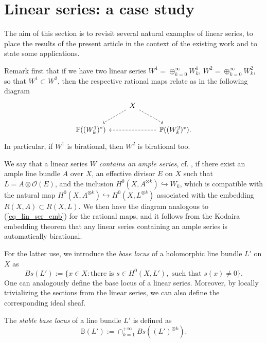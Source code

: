 \documentclass[12pt]{article}
\numberwithin{equation}{section}
\theoremstyle{theorem}
\theoremstyle{definition}
\theoremstyle{remark}
\begin{document}
	\section{Linear series: a case study}\label{sect_exampl}
	The aim of this section is to revisit several natural examples of linear series, to place the results of the present article in the context of the existing work and to state some applications.
	\par 
	Remark first that if we have two linear series $W^1 = \oplus_{k = 0}^{\infty} W^1_k$, $W^2 = \oplus_{k = 0}^{\infty} W^2_k$, so that $W^1 \subset W^2$, then the respective rational maps relate as in the following diagram
	\begin{equation}\label{eq_lin_ser_emb}
		\begin{tikzcd}
		& X \arrow[dl, dashed] \arrow[dr, dashed] & \\
\mathbb{P}((W_k^1)^*) & & \arrow[ll, dashed] \mathbb{P}((W_k^2)^*).
		\end{tikzcd}
	\end{equation}
	In particular, if $W^1$ is birational, then $W^2$ is birational too.
	\par 
	We say that a linear series $W$ \textit{contains an ample series}, cf. \cite{LazMus}, if there exist an ample line bundle $A$ over $X$, an effective divisor $E$ on $X$ such that $L = A \otimes \mathscr{O}(E)$, and the inclusion $H^0(X, A^{\otimes k}) \hookrightarrow W_k$, which is compatible with the natural map $H^0(X, A^{\otimes k}) \hookrightarrow H^0(X, L^{\otimes k})$ associated with the embedding $R(X, A) \subset R(X, L)$.
	We then have the diagram analogous to (\ref{eq_lin_ser_emb}) for the rational maps, and it follows from the Kodaira embedding theorem that any linear series containing an ample series is automatically birational.
	\par 
	For the latter use, we introduce the \textit{base locus} of a holomorphic line bundle $L'$ on $X$ as
	\begin{equation}
		Bs(L') := \Big\{ x \in X : \text{there is } s \in H^0(X, L'), \text{ such that } s(x) \neq 0 \Big\}.
	\end{equation}
	One can analogously define the base locus of a linear series.
	Moreover, by locally trivializing the sections from the linear series, we can also define the corresponding ideal sheaf. 
	\par 
	The \textit{stable base locus} of a line bundle $L'$ is defined as
	\begin{equation}
		\mathbb{B}(L') := \cap_{k = 1}^{+\infty} Bs((L')^{\otimes k}).
	\end{equation}
\end{document}
